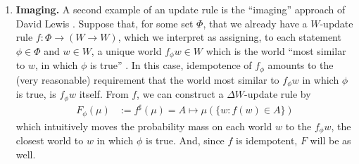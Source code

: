\begin{enumerate}
	\item
	\textbf{Imaging.}
	A second example of an update rule is the ``imaging'' approach of David Lewis
	\parencite{lewis1976probabilities}.
	Suppose that, for some set $\Phi$, that we already have a $W$-update rule
	$f : \Phi \to (W \to W)$, which we interpret as assigning, to each statement $\phi \in \Phi$ and $w \in W$, a unique world $f_\phi w \in W$ which is the world ``most similar to $w$, in which $\phi$ is true'' \parencite{gardenfors1979imaging}.
	In this case, idempotence of $f_\phi$ amounts to the (very reasonable) requirement that the world most similar to $f_\phi w$ in which $\phi$ is true, is $f_\phi w$ itself.
	From $f$, we can construct a $\Delta W$-update rule by
	\[
    	\begin{aligned}
    		F_\phi(\mu) &:=
    			f^{\sharp}(\mu)
    			= A \mapsto \mu(\{w : f(w) \in A\})
    	\end{aligned}
	\]
	which intuitively moves the probability mass on each world $w$ to the $f_\phi w$, the closest world to $w$ in which $\phi$ is true.
	And, since $f$ is idempotent, $F$ will be as well.





\end{enumerate}
